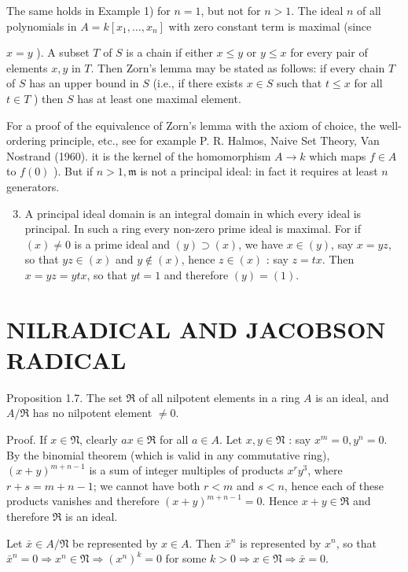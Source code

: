 \documentclass{standalone}
\theoremstyle{definition}
\theoremstyle{remark}
\begin{document}
The same holds in Example 1) for $n=1$, but not for $n>1$. The ideal $n$ of all polynomials in $A=k\left[x_{1}, \ldots, x_{n}\right]$ with zero constant term is maximal (since

$x=y$ ). A subset $T$ of $S$ is a chain if either $x \leqslant y$ or $y \leqslant x$ for every pair of elements $x, y$ in $T$. Then Zorn's lemma may be stated as follows: if every chain $T$ of $S$ has an upper bound in $S$ (i.e., if there exists $x \in S$ such that $t \leqslant x$ for all $t \in T$ ) then $S$ has at least one maximal element.

For a proof of the equivalence of Zorn's lemma with the axiom of choice, the well-ordering principle, etc., see for example P. R. Halmos, Naive Set Theory, Van Nostrand (1960). it is the kernel of the homomorphism $A \rightarrow k$ which maps $f \in A$ to $f(0)$ ). But if $n>1, \mathfrak{m}$ is not a principal ideal: in fact it requires at least $n$ generators.

\begin{enumerate}
  \setcounter{enumi}{2}
  \item A principal ideal domain is an integral domain in which every ideal is principal. In such a ring every non-zero prime ideal is maximal. For if $(x) \neq 0$ is a prime ideal and $(y) \supset(x)$, we have $x \in(y)$, say $x=y z$, so that $y z \in(x)$ and $y \notin(x)$, hence $z \in(x)$ : say $z=t x$. Then $x=y z=y t x$, so that $y t=1$ and therefore $(y)=(1)$.
\end{enumerate}

\section{NILRADICAL AND JACOBSON RADICAL}
Proposition 1.7. The set $\mathfrak{R}$ of all nilpotent elements in a ring $A$ is an ideal, and $A / \Re$ has no nilpotent element $\neq 0$.

Proof. If $x \in \mathfrak{N}$, clearly $a x \in \mathfrak{R}$ for all $a \in A$. Let $x, y \in \mathfrak{N}$ : say $x^{m}=0, y^{n}=0$. By the binomial theorem (which is valid in any commutative ring), $(x+y)^{m+n-1}$ is a sum of integer multiples of products $x^{r} y^{3}$, where $r+s=m+n-1$; we cannot have both $r<m$ and $s<n$, hence each of these products vanishes and therefore $(x+y)^{m+n-1}=0$. Hence $x+y \in \mathfrak{R}$ and therefore $\mathfrak{R}$ is an ideal.

Let $\bar{x} \in A / \mathfrak{N}$ be represented by $x \in A$. Then $\bar{x}^{n}$ is represented by $x^{n}$, so that $\bar{x}^{n}=0 \Rightarrow x^{n} \in \mathfrak{N} \Rightarrow\left(x^{n}\right)^{k}=0$ for some $k>0 \Rightarrow x \in \mathfrak{N} \Rightarrow \bar{x}=0$.
\end{document}
